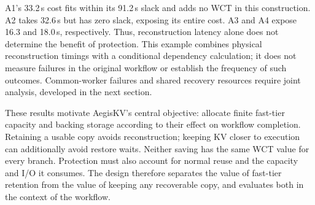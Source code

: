 A1's 33.2\,s cost fits within its 91.2\,s slack and adds no WCT
in this construction. A2 takes 32.6\,s but has zero slack,
exposing its entire cost. A3 and A4 expose 16.3 and
18.0\,s, respectively. Thus, reconstruction latency alone does
not determine the benefit of protection. This example combines physical
reconstruction timings with a conditional dependency calculation; it
does not measure failures in the original workflow or establish the
frequency of such outcomes. Common-worker failures and shared recovery
resources require joint analysis, developed in the next section.

\label{sec:motivation-goals}
These results motivate AegisKV's central objective: allocate finite
fast-tier capacity and backing storage according to their effect on
workflow completion. Retaining a usable copy avoids reconstruction;
keeping KV closer to execution can additionally avoid restore waits.
Neither saving has the same WCT value for every branch. Protection must also account for normal reuse
and the capacity and I/O it consumes. The design therefore separates the
value of fast-tier retention from the value of keeping any recoverable
copy, and evaluates both in the context of the workflow.
